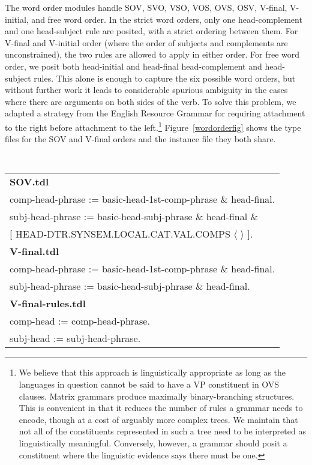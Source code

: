 \documentclass[11pt]{article}
\begin{document}
The word order modules 
handle 
SOV, SVO, VSO, VOS, OVS, OSV, V-final, V-initial, and
free word order.
In the
strict word orders, only one head-complement and one head-subject rule
are posited, with a strict ordering between them.  For V-final and
V-initial order (where the order of subjects and complements are
unconstrained), %
the two rules are allowed to
apply in either order.  For  free word order, we posit both
head-initial and head-final head-complement and head-subject rules.
This alone is enough to capture the six possible word orders, but
without further work it leads to considerable spurious ambiguity in
the cases where there are arguments on both sides of the verb.  To
solve this problem, we adapted a strategy from the English Resource
Grammar for requiring attachment to the right before attachment to the
left.\footnote{We believe that this approach is linguistically
appropriate as long as the languages in question cannot be said to
have a VP constituent in OVS clauses.  Matrix grammars produce
maximally binary-branching structures.  This is convenient in that it
reduces the number of rules a grammar needs to encode, though at a
cost of arguably more complex trees.  We maintain that not all of the
constituents represented in such a tree need to be interpreted as
linguistically meaningful.  Conversely, however, a grammar
should posit a constituent where the linguistic evidence says there
must be one.}
Figure~\ref{wordorderfig} shows the type files for the SOV and
V-final orders and the instance file they both share.

\begin{figure*}[ht]
\begin{center}
{\tt\small
\begin{tabular}{l}
\hline
{\bf SOV.tdl}\\
comp-head-phrase := basic-head-1st-comp-phrase \& head-final.\\
subj-head-phrase := basic-head-subj-phrase \& head-final \&\\
   \phantom{foo}[ HEAD-DTR.SYNSEM.LOCAL.CAT.VAL.COMPS $\langle$ $\rangle$ ].\\
{\bf V-final.tdl}\\
comp-head-phrase := basic-head-1st-comp-phrase \& head-final.\\
subj-head-phrase := basic-head-subj-phrase \& head-final.\\
{\bf V-final-rules.tdl}\\
comp-head := comp-head-phrase.\\
subj-head := subj-head-phrase.\\
\hline
\end{tabular}
}
\end{center}
\caption{SOV and V-final basic word order modules}
\label{wordorderfig}
\end{figure*}
\end{document}
